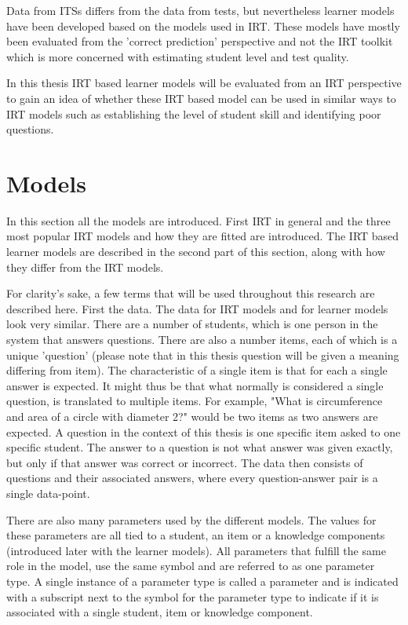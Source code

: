 \documentclass{scrartcl}
\begin{document}
Data from ITSs differs from the data from tests, but nevertheless learner models have been developed based on the models used in IRT. These models have mostly been evaluated from the 'correct prediction' perspective and not the IRT toolkit which is more concerned with estimating student level and test quality.

In this thesis IRT based learner models will be evaluated from an IRT perspective to gain an idea of whether these IRT based model can be used in similar ways to IRT models such as establishing the level of student skill and identifying poor questions. 

\section{Models}
In this section all the models are introduced. First IRT in general and the three most popular IRT models and how they are fitted are introduced. The IRT based learner models are described in the second part of this section, along with how they differ from the IRT models.

For clarity's sake, a few terms that will be used throughout this research are described here. First the data. The data for IRT models and for learner models look very similar. There are a number of students, which is one person in the system that answers questions. There are also a number items, each of which is a unique 'question' (please note that in this thesis question will be given a meaning differing from item). The characteristic of a single item is that for each a single answer is expected. It might thus be that what normally is considered a single question, is translated to multiple items. For example, "What is circumference and area of a circle with diameter 2?" would be two items as two answers are expected. A question in the context of this thesis is one specific item asked to one specific student. The answer to a question is not what answer was given exactly, but only if that answer was correct or incorrect. The data then consists of questions and their associated answers, where every question-answer pair is a single data-point.  

There are also many parameters used by the different models. The values for these parameters are all tied to a student, an item or a knowledge components (introduced later with the learner models). All parameters that fulfill the same role in the model, use the same symbol and are referred to as one parameter type. A single instance of a parameter type is called a parameter and is indicated with a subscript next to the symbol for the parameter type to indicate if it is associated with a single student, item or knowledge component.
\end{document}
